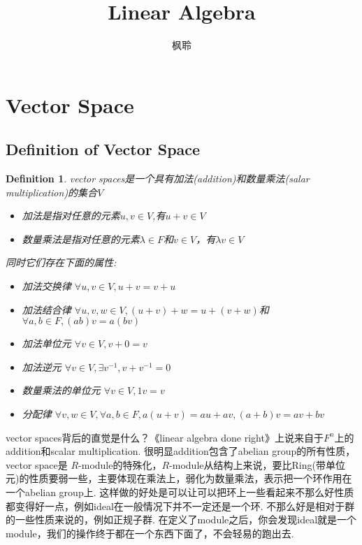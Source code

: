 \documentclass{article}
\newtheorem{definition}[theorem]{Definition}
\begin{document}
\title{Linear Algebra}
\author{枫聆}
\maketitle

\tableofcontents
\newpage 
\section{Vector Space}
\subsection{Definition of Vector Space}       

\begin{definition}
\rm vector spaces是一个具有加法(addition)和数量乘法(salar multiplication)的集合$V$

\begin{itemize}
	\item 加法是指对任意的元素$u,v \in V$,有$u+v \in V$
	\item 数量乘法是指对任意的元素$\lambda \in F$和$v \in V$，有$\lambda v \in V$
\end{itemize}

同时它们存在下面的属性:
\begin{itemize}
	\item 加法交换律 $\forall u,v \in V,u+v=v+u$
	\item 加法结合律 $\forall u,v,w \in V ,(u+v)+w=u+(v+w)$和$\forall a,b \in F,(ab)v=a(bv)$
	\item 加法单位元 $\forall v\in V,v+0=v$
	\item 加法逆元 $\forall v \in V,\exists v^{-1} ,v+v^{-1}=0$
	\item 数量乘法的单位元 $\forall v \in V,1v=v$
	\item 分配律 $\forall v,w \in V ,\forall a,b \in F, a(u+v)=au+av,(a+b)v=av+bv$
\end{itemize}
\end{definition}


vector spaces背后的直觉是什么？《linear algebra done right》上说来自于$F^{n}$上的addition和scalar multiplication. 很明显addition包含了abelian group的所有性质，vector space是 $R$-module的特殊化，$R$-module从结构上来说，要比Ring(带单位元)的性质要弱一些，主要体现在乘法上，弱化为数量乘法，表示把一个环作用在一个abelian group上. 这样做的好处是可以让可以把环上一些看起来不那么好性质都变得好一点，例如ideal在一般情况下并不一定还是一个环. 不那么好是相对于群的一些性质来说的，例如正规子群. 在定义了module之后，你会发现ideal就是一个module，我们的操作终于都在一个东西下面了，不会轻易的跑出去.
\end{document}
